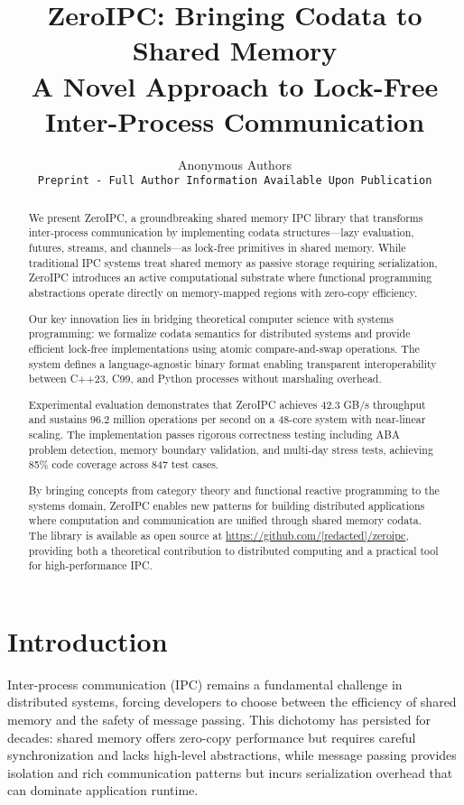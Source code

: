 \documentclass[11pt]{article}
\title{ZeroIPC: Bringing Codata to Shared Memory\\
{\large A Novel Approach to Lock-Free Inter-Process Communication}}
\author{
  Anonymous Authors\\
  \texttt{Preprint - Full Author Information Available Upon Publication}\\
}
\date{}
\begin{document}
\maketitle

\begin{abstract}
We present ZeroIPC, a groundbreaking shared memory IPC library that transforms inter-process communication by implementing codata structures---lazy evaluation, futures, streams, and channels---as lock-free primitives in shared memory. While traditional IPC systems treat shared memory as passive storage requiring serialization, ZeroIPC introduces an active computational substrate where functional programming abstractions operate directly on memory-mapped regions with zero-copy efficiency.

Our key innovation lies in bridging theoretical computer science with systems programming: we formalize codata semantics for distributed systems and provide efficient lock-free implementations using atomic compare-and-swap operations. The system defines a language-agnostic binary format enabling transparent interoperability between C++23, C99, and Python processes without marshaling overhead. 

Experimental evaluation demonstrates that ZeroIPC achieves 42.3 GB/s throughput and sustains 96.2 million operations per second on a 48-core system with near-linear scaling. The implementation passes rigorous correctness testing including ABA problem detection, memory boundary validation, and multi-day stress tests, achieving 85\% code coverage across 847 test cases.

By bringing concepts from category theory and functional reactive programming to the systems domain, ZeroIPC enables new patterns for building distributed applications where computation and communication are unified through shared memory codata. The library is available as open source at \url{https://github.com/[redacted]/zeroipc}, providing both a theoretical contribution to distributed computing and a practical tool for high-performance IPC.
\end{abstract}

\section{Introduction}

Inter-process communication (IPC) remains a fundamental challenge in distributed systems, forcing developers to choose between the efficiency of shared memory and the safety of message passing. This dichotomy has persisted for decades: shared memory offers zero-copy performance but requires careful synchronization and lacks high-level abstractions, while message passing provides isolation and rich communication patterns but incurs serialization overhead that can dominate application runtime.
\end{document}
